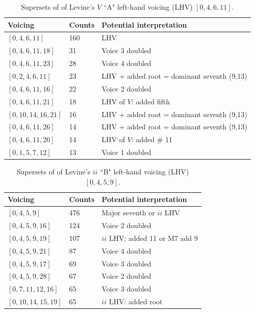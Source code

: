 \begin{table}%
  \caption{Supersets of of Levine's $V$ ``A" left-hand voicing (LHV) $[0,4,6,11]$.}
  \centering
\begin{tabular}{l| l | l}
\hline\hline
Voicing & Counts & Potential interpretation \\ [0.5ex]
\hline
$[0,4,6,11]$ & 160 & LHV \\
$[0,4,6,11,18]$ & 31 & Voice 3 doubled \\
$[0,4,6,11,23]$ & 28 & Voice 4 doubled \\
$[0,2,4,6,11]$ & 23 & LHV + added root = dominant seventh (9,13) \\
$[0,4,6,11,16]$ & 22 & Voice 2 doubled \\
$[0,4,6,11,21]$ & 18 & LHV of $V$: added fifth \\
$[0,10,14,16,21]$ & 16 & LHV + added root = dominant seventh (9,13) \\
$[0,4,6,11,26]$ & 14 & LHV + added root = dominant seventh (9,13) \\
$[0,4,6,11,20]$ & 14 & LHV of $V$: added \# 11 \\
$[0,1,5,7,12]$ & 13 & Voice 1 doubled \\[1ex]
\hline
\end{tabular}
\label{a_V_lhv}
\end{table}

\begin{table}%
  \caption{Supersets of of Levine's $ii$ ``B" left-hand voicing (LHV) $[0,4,5,9]$.}
  \centering
\begin{tabular}{l| l | l}
\hline\hline
Voicing & Counts & Potential interpretation \\ [0.5ex]
\hline
$[0,4,5,9]$ & 476 & Major seventh or $ii$ LHV \\
$[0,4,5,9,16]$ & 124 & Voice 2 doubled \\
$[0,4,5,9,19]$ & 107 & $ii$ LHV: added 11 or M7 add 9 \\
$[0,4,5,9,21]$ & 87 & Voice 4 doubled \\
$[0,4,5,9,17]$ & 69 & Voice 3 doubled \\
$[0,4,5,9,28]$ & 67 & Voice 2 doubled \\
$[0,7,11,12,16]$ & 65 & Voice 3 doubled \\
$[0,10,14,15,19]$ & 65 & $ii$ LHV: added root \\[1ex]
\hline
\end{tabular}
\label{b_ii_lhv}
\end{table}

